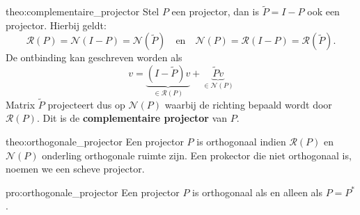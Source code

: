 \begin{theo}{theo:complementaire_projector}
    Stel $P$ een projector, dan is $\tilde{P} = I - P$ ook een projector. Hierbij geldt:
    \begin{equation*}
        \mathcal{R}(P) = \mathcal{N}(I-P) = \mathcal{N}(\tilde{P})  \quad \text{en} \quad \mathcal{N}(P) = \mathcal{R}(I-P) = \mathcal{R}(\tilde{P}).
    \end{equation*}
    De ontbinding kan geschreven worden als 
    \begin{equation*}
        v = \underbrace{(I - \tilde{P})v}_{\in \mathcal{R}(P)} + \underbrace{\tilde{P}v}_{\in \mathcal{N}(P)}
    \end{equation*}
    Matrix $\tilde{P}$ projecteert dus op $\mathcal{N}(P)$ waarbij de richting bepaald wordt door $\mathcal{R}(P)$. Dit is de \textbf{complementaire projector} van $P$.
\end{theo}

\newpage

\begin{theo}{theo:orthogonale_projector}
    Een projector $P$ is orthogonaal indien $\mathcal{R}(P)$ en $\mathcal{N}(P)$ onderling orthogonale ruimte zijn. Een prokector die niet orthogonaal is, noemen we een scheve projector.
\end{theo}

\begin{pro}{pro:orthogonale_projector}
    Een projector $P$ is orthogonaal als en alleen als $P = P^*$.
\end{pro}

